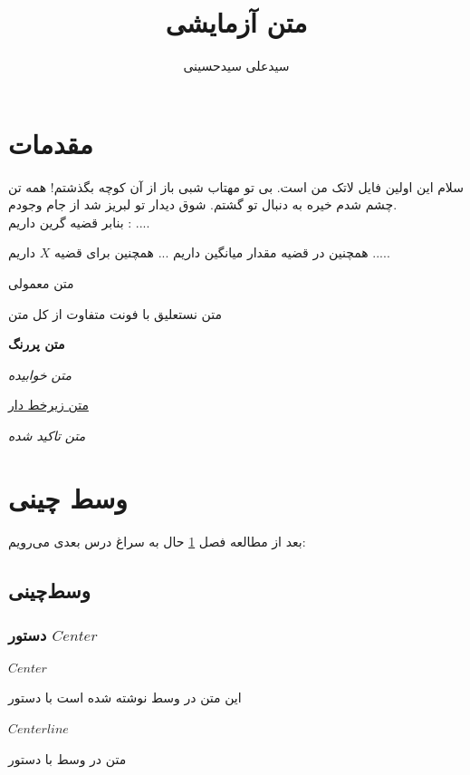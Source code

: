 \documentclass[12pt]{book}
\title{متن آزمایشی}
\author{سیدعلی سیدحسینی }
\begin{document}
\maketitle
\chapter{مقدمات}\label{chap1}
	سلام این اولین فایل لاتک من است.
	  بی تو مهتاب شبی باز از آن کوچه بگذشتم! همه تن چشم شدم خیره به دنبال تو گشتم. شوق دیدار تو لبریز شد از جام وجودم.  \\ بنابر قضیه گرین داریم : ....
	 
	  همچنین در قضیه مقدار میانگین داریم ...
	  همچنین برای قضیه $X$  داریم .....

\textrm{متن معمولی} 

{\Huge \nast  متن نستعلیق با فونت متفاوت از کل متن }

\textbf{متن پررنگ}

\textit{متن خوابیده}

\underline{متن زیرخط دار}


\emph{متن تاکید شده}

\chapter{وسط چینی}\label{chap2}
	بعد از مطالعه فصل \ref{chap1} حال به سراغ درس بعدی می‌رویم:
\section{وسط‌چینی}
\subsection{دستور $Center$}
\subsubsection{$Center$}
\begin{center}

	
	این متن در وسط نوشته شده است با دستور 
\end{center}
\subsubsection{$Center line$}
\centerline{متن در وسط با دستور }
\end{document}
